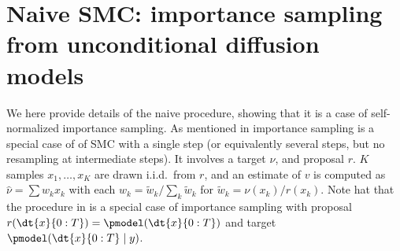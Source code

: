 
\section{Naive SMC: importance sampling from unconditional diffusion models}
We here provide details of the naive procedure, showing that it is a case of self-normalized importance sampling.
As mentioned in  importance sampling is a special case of of SMC with a single step (or equivalently several steps, but no resampling at intermediate steps).
It involves a target $\nu$,
and proposal $r$. 
$K$ samples $x_1,\dots, x_K$ are drawn i.i.d.\ from $r$,
and an estimate of $v$ is computed as 
$\hat \nu = \sum w_k x_k$ with each $w_k = \tilde w_k / \sum_k \tilde w_k$
for $\tilde w_k = \nu(x_k)/r(x_k).$
Note hat that the procedure in  is a special case of importance sampling with proposal $r(\dt{x}{0:T})=\pmodel(\dt{x}{0:T})$ and target $\pmodel(\dt{x}{0:T} \mid y)$.


